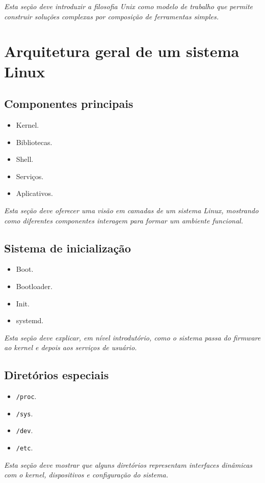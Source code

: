 \documentclass[12pt,openany]{book}
\newcommand{\placeholder}[1]{
    \par\medskip
    \noindent\textit{#1}
    \par\medskip
}
\newcommand{\topicos}[1]{
    \begin{itemize}
        #1
    \end{itemize}
}
\begin{document}
\begin{refsection}
\placeholder{Esta seção deve introduzir a filosofia Unix como modelo de trabalho que permite construir soluções complexas por composição de ferramentas simples.}

\chapter{Arquitetura geral de um sistema Linux}

\section{Componentes principais}

\topicos{
    \item Kernel.
    \item Bibliotecas.
    \item Shell.
    \item Serviços.
    \item Aplicativos.
}

\placeholder{Esta seção deve oferecer uma visão em camadas de um sistema Linux, mostrando como diferentes componentes interagem para formar um ambiente funcional.}

\section{Sistema de inicialização}

\topicos{
    \item Boot.
    \item Bootloader.
    \item Init.
    \item systemd.
}

\placeholder{Esta seção deve explicar, em nível introdutório, como o sistema passa do firmware ao kernel e depois aos serviços de usuário.}

\section{Diretórios especiais}

\topicos{
    \item \texttt{/proc}.
    \item \texttt{/sys}.
    \item \texttt{/dev}.
    \item \texttt{/etc}.
}

\placeholder{Esta seção deve mostrar que alguns diretórios representam interfaces dinâmicas com o kernel, dispositivos e configuração do sistema.}


\end{refsection}
\end{document}
